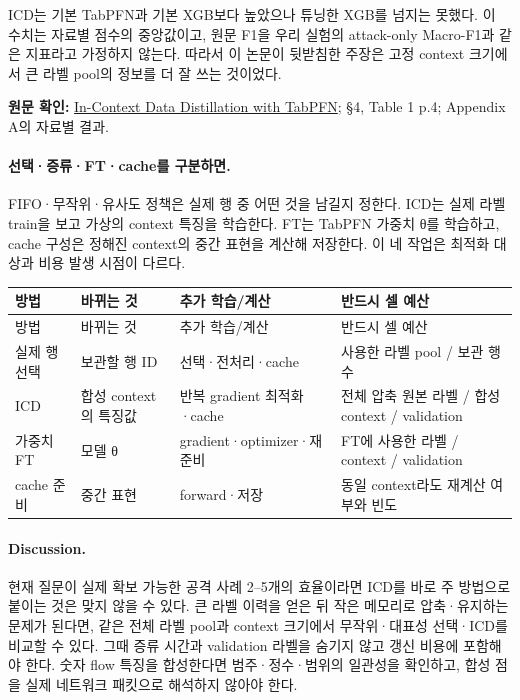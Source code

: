 ICD는 기본 TabPFN과 기본 XGB보다 높았으나 튜닝한 XGB를 넘지는 못했다. 이 수치는 자료별 점수의 중앙값이고, 원문 F1을 우리 실험의 attack-only Macro-F1과 같은 지표라고 가정하지 않는다. 따라서 이 논문이 뒷받침한 주장은 고정 context 크기에서 큰 라벨 pool의 정보를 더 잘 쓰는 것이었다.


{\small\textbf{원문 확인:} \href{https://arxiv.org/abs/2402.06971}{In-Context Data Distillation with TabPFN}; §4, Table 1 p.4; Appendix A의 자료별 결과.}\par

\paragraph{선택·증류·FT·cache를 구분하면.} FIFO·무작위·유사도 정책은 실제 행 중 어떤 것을 남길지 정한다. ICD는 실제 라벨 train을 보고 가상의 context 특징을 학습한다. FT는 TabPFN 가중치 θ를 학습하고, cache 구성은 정해진 context의 중간 표현을 계산해 저장한다. 이 네 작업은 최적화 대상과 비용 발생 시점이 다르다.


\begingroup
\footnotesize
\begin{longtable}{>{\raggedright\arraybackslash}p{}>{\raggedright\arraybackslash}p{}>{\raggedright\arraybackslash}p{}>{\raggedright\arraybackslash}p{}}
\toprule
방법 & 바뀌는 것 & 추가 학습/\allowbreak{}계산 & 반드시 셀 예산 \\ \midrule
\endfirsthead
방법 & 바뀌는 것 & 추가 학습/\allowbreak{}계산 & 반드시 셀 예산 \\ \midrule
\endhead
{}실제 행 선택 & 보관할 행 ID & 선택·전처리·cache & 사용한 라벨 pool /\allowbreak{} 보관 행 수 \\
{}ICD & 합성 context의 특징값 & 반복 gradient 최적화·cache & 전체 압축 원본 라벨 /\allowbreak{} 합성 context /\allowbreak{} validation \\
{}가중치 FT & 모델 θ & gradient·optimizer·재준비 & FT에 사용한 라벨 /\allowbreak{} context /\allowbreak{} validation \\
{}cache 준비 & 중간 표현 & forward·저장 & 동일 context라도 재계산 여부와 빈도 \\
\bottomrule
\end{longtable}
\endgroup


\paragraph{Discussion.} 현재 질문이 실제 확보 가능한 공격 사례 2–5개의 효율이라면 ICD를 바로 주 방법으로 붙이는 것은 맞지 않을 수 있다. 큰 라벨 이력을 얻은 뒤 작은 메모리로 압축·유지하는 문제가 된다면, 같은 전체 라벨 pool과 context 크기에서 무작위·대표성 선택·ICD를 비교할 수 있다. 그때 증류 시간과 validation 라벨을 숨기지 않고 갱신 비용에 포함해야 한다. 숫자 flow 특징을 합성한다면 범주·정수·범위의 일관성을 확인하고, 합성 점을 실제 네트워크 패킷으로 해석하지 않아야 한다.


